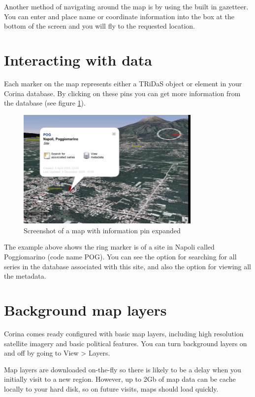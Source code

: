 Another method of navigating around the map is by using the built in gazetteer. You can enter and place name or coordinate information into the box at the bottom of the screen and you will fly to the requested location. 


\section{Interacting with data}

Each marker on the map represents either a TRiDaS object or element in your Corina database. By clicking on these pins you can get more information from the database (see figure \ref{fig:mappin}).

\begin{figure}[hbtp]
  \caption{Screenshot of a map with information pin expanded}
  \label{fig:mappin}
  \centering
    \includegraphics[width=0.8\textwidth]{Images/mappinexample.png}
\end{figure}

The example above shows the ring marker is of a site in Napoli called Poggiomarino (code name POG). You can see the option for searching for all series in the database associated with this site, and also the option for viewing all the metadata. 

\section{Background map layers}

Corina comes ready configured with basic map layers, including high resolution satellite imagery and basic political features. You can turn background layers on and off by going to View > Layers.

Map layers are downloaded on-the-fly so there is likely to be a delay when you initially visit to a new region. However, up to 2Gb of map data can be cache locally to your hard disk, so on future visits, maps should load quickly.

